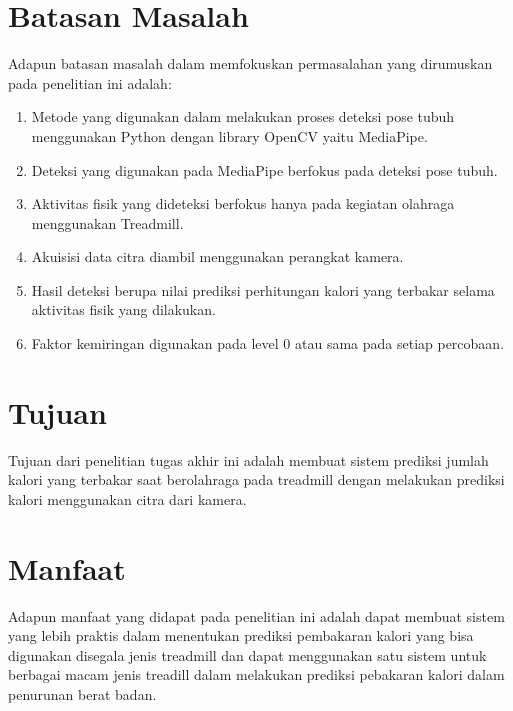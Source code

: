 \section{Batasan Masalah}
\label{sec:batasanmasalah}

Adapun batasan masalah dalam memfokuskan permasalahan yang dirumuskan pada penelitian ini adalah:

\begin{enumerate}[nolistsep]

  \item Metode yang digunakan dalam melakukan proses deteksi pose tubuh menggunakan Python dengan library OpenCV yaitu MediaPipe.

  \item Deteksi yang digunakan pada MediaPipe berfokus pada deteksi pose tubuh.

  \item Aktivitas fisik yang dideteksi berfokus hanya pada kegiatan olahraga menggunakan Treadmill.

  \item Akuisisi data citra diambil menggunakan perangkat kamera.

  \item Hasil deteksi berupa nilai prediksi perhitungan kalori yang terbakar selama aktivitas fisik yang dilakukan.

  \item Faktor kemiringan digunakan pada level 0 atau sama pada setiap percobaan.

\end{enumerate}

\section{Tujuan}
\label{sec:Tujuan}

Tujuan dari penelitian tugas akhir ini adalah membuat sistem prediksi jumlah kalori yang terbakar saat berolahraga pada treadmill dengan melakukan prediksi kalori menggunakan citra dari kamera.


\section{Manfaat}

Adapun manfaat yang didapat pada penelitian ini adalah dapat membuat sistem yang lebih praktis dalam menentukan prediksi pembakaran kalori yang bisa digunakan disegala jenis treadmill dan dapat menggunakan satu sistem untuk berbagai macam jenis treadill dalam melakukan prediksi pebakaran kalori dalam penurunan berat badan.
